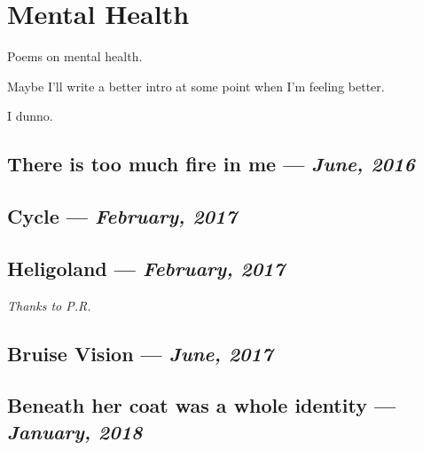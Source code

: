 \documentclass[10pt]{memoir}
\begin{document}

  \chapter{Mental Health}

  Poems on mental health.

  \vfill

  \noindent Maybe I'll write a better intro at some point when I'm feeling better.

  \vfill

  \hfill I dunno.
  \thispagestyle{empty}
  \newpage


  \section{There is too much fire in me --- \textit{June, 2016}}

  
  \newpage


  \section{Cycle --- \textit{February, 2017}}

  
  \newpage


  \section{Heligoland --- \textit{February, 2017}}

  

  \textit{Thanks to P.R.}
  \newpage


  \section{Bruise Vision --- \textit{June, 2017}}

  
  \newpage


  \section{Beneath her coat was a whole identity --- \textit{January, 2018}}
\end{document}
